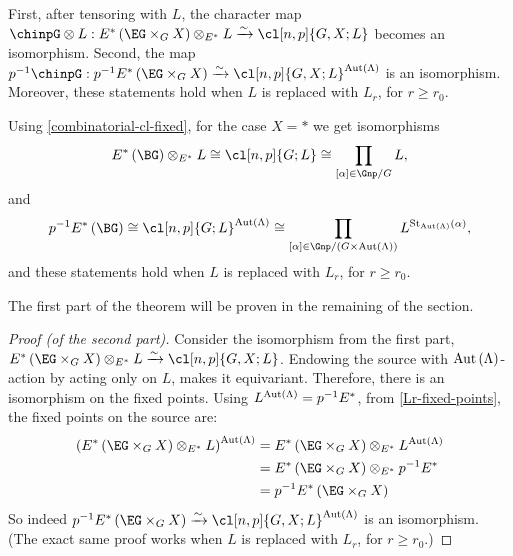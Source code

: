 \begin{theorem}\label{theorem-c}
	First, after tensoring with $L$, the character map
	$\chinpG \otimes L: E^*\left(\EG \times_G X\right) \otimes_{E^*} L \xrightarrow{\sim} \cl[n,p]{G,X; L}$
	becomes an isomorphism.
	Second, the map
	$p^{-1}\chinpG: p^{-1} E^*\left(\EG \times_G X\right) \xrightarrow{\sim} \cl[n,p]{G,X; L}^{\aut \left(\Lambda\right)}$
	is an isomorphism.
	Moreover, these statements hold when $L$ is replaced with $L_r$, for $r \geq r_0$.
\end{theorem}

\begin{corollary}\label{theorem-c-pt}
	Using \cref{combinatorial-cl-fixed}, for the case $X = *$ we get isomorphisms
	$$
	E^*\left(\BG\right) \otimes_{E^*} L
	\cong \cl[n,p]{G; L}
	\cong \prod_{\left[\alpha\right] \in \Gnp/G} L,
	$$
	and
	$$
	p^{-1} E^*\left(\BG\right)
	\cong \cl[n,p]{G; L}^{\aut \left(\Lambda\right)}
	\cong \prod_{\left[\alpha\right] \in \Gnp/{\left(G \times \aut \left(\Lambda\right)\right)}}
	L^{\stab_{\aut \left(\Lambda\right)}\left(\alpha\right)},
	$$
	and these statements hold when $L$ is replaced with $L_r$, for $r \geq r_0$.
\end{corollary}

The first part of the theorem will be proven in the remaining of the section.

\begin{proof}[Proof (of the second part)]
	Consider the isomorphism from the first part,
	$E^*\left(\EG \times_G X\right) \otimes_{E^*} L \xrightarrow{\sim} \cl[n,p]{G,X; L}$.
	Endowing the source with $\operatorname{Aut} \left(\Lambda\right)$-action by acting only on $L$, makes it equivariant.
	Therefore, there is an isomorphism on the fixed points.
	Using $L^{\operatorname{Aut} \left(\Lambda\right)} = p^{-1} E^*$, from \cref{Lr-fixed-points}, the fixed points on the source are:
	\begin{align*}
		\left(E^*\left(\EG \times_G X\right) \otimes_{E^*} L\right)^{\aut \left(\Lambda\right)}
		&= E^*\left(\EG \times_G X\right) \otimes_{E^*} L^{\aut \left(\Lambda\right)}\\
		&= E^*\left(\EG \times_G X\right) \otimes_{E^*} p^{-1} E^*\\
		&= p^{-1} E^*\left(\EG \times_G X\right)
	\end{align*}
	So indeed $p^{-1} E^*\left(\EG \times_G X\right) \xrightarrow{\sim} \cl[n,p]{G,X; L}^{\aut \left(\Lambda\right)}$ is an isomorphism.
	(The exact same proof works when $L$ is replaced with $L_r$, for $r \geq r_0$.)
\end{proof}



